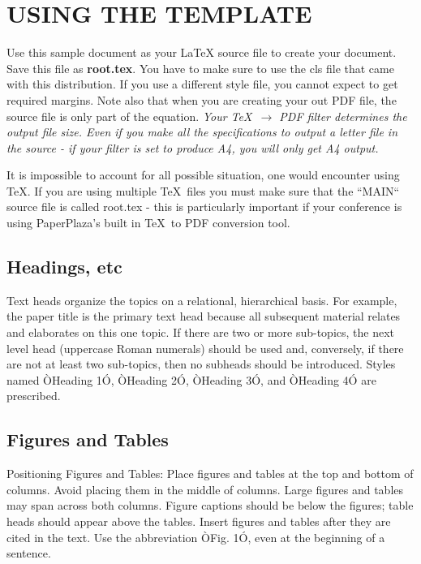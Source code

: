 \documentclass[letterpaper, 10 pt, conference]{ieeeconf}  %
\begin{document}
\section{USING THE TEMPLATE}

Use this sample document as your LaTeX source file to create your document. Save this file as {\bf root.tex}. You have to make sure to use the cls file that came with this distribution. If you use a different style file, you cannot expect to get required margins. Note also that when you are creating your out PDF file, the source file is only part of the equation. {\it Your \TeX\ $\rightarrow$ PDF filter determines the output file size. Even if you make all the specifications to output a letter file in the source - if your filter is set to produce A4, you will only get A4 output. }

It is impossible to account for all possible situation, one would encounter using \TeX. If you are using multiple \TeX\ files you must make sure that the ``MAIN`` source file is called root.tex - this is particularly important if your conference is using PaperPlaza's built in \TeX\ to PDF conversion tool.

\subsection{Headings, etc}

Text heads organize the topics on a relational, hierarchical basis. For example, the paper title is the primary text head because all subsequent material relates and elaborates on this one topic. If there are two or more sub-topics, the next level head (uppercase Roman numerals) should be used and, conversely, if there are not at least two sub-topics, then no subheads should be introduced. Styles named ÒHeading 1Ó, ÒHeading 2Ó, ÒHeading 3Ó, and ÒHeading 4Ó are prescribed.

\subsection{Figures and Tables}

Positioning Figures and Tables: Place figures and tables at the top and bottom of columns. Avoid placing them in the middle of columns. Large figures and tables may span across both columns. Figure captions should be below the figures; table heads should appear above the tables. Insert figures and tables after they are cited in the text. Use the abbreviation ÒFig. 1Ó, even at the beginning of a sentence.
\end{document}

